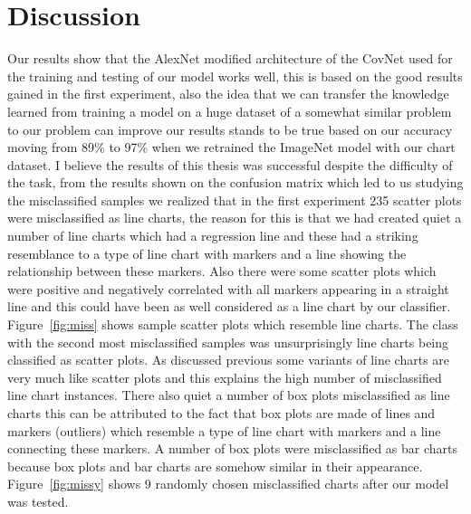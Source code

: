 \documentclass[12pt, a4paper,oneside]{report}
\begin{document}
\section{Discussion}
Our results show that the AlexNet modified architecture of the CovNet used for the training and testing of our model works well, this is based on the good results gained in the first experiment, also the idea that we can transfer the knowledge learned from training a model on a huge dataset of a somewhat similar problem to our problem can improve our results stands to be true based on our accuracy moving from 89\% to 97\% when we retrained the ImageNet model with our chart dataset. I believe the results of this thesis was successful despite the difficulty of the task, from the results shown on the confusion matrix which led to us studying the misclassified samples we realized that in the first experiment 235 scatter plots were misclassified as line charts, the reason for this is that we had created quiet a number of line charts which had a regression line and these had a striking resemblance to a type of line chart with markers and a line showing the relationship between these markers. Also there were some scatter plots which were positive and negatively correlated with all markers appearing in a straight line and this could have been as well considered as a line chart by our classifier. Figure~\ref{fig:miss} shows sample scatter plots which resemble line charts. The class with the second most misclassified samples was unsurprisingly line charts being classified as scatter plots. As discussed previous some variants of line charts are very much like scatter plots and this explains the high number of misclassified line chart instances. There also quiet a number of box plots misclassified as line charts this can be attributed to the fact that box plots are made of lines and markers (outliers) which resemble a type of line chart with markers and a line connecting these markers. A number of box plots were misclassified as bar charts because box plots and bar charts are somehow similar in their appearance.
Figure~\ref{fig:missy} shows 9 randomly chosen misclassified charts after our model was tested.
\end{document}
